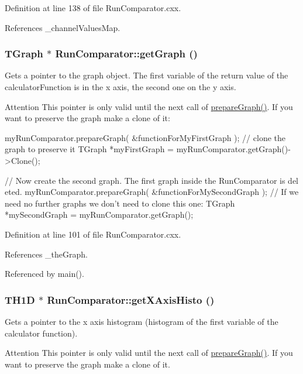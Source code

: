 Definition at line 138 of file RunComparator.cxx.

References \_\-channelValuesMap.\hypertarget{class_run_comparator_a75e708544897139bec4a7b11dc66925b}{
\subsubsection[{getGraph}]{\setlength{\rightskip}{0pt plus 5cm}TGraph $\ast$ RunComparator::getGraph ()}}
\label{class_run_comparator_a75e708544897139bec4a7b11dc66925b}


Gets a pointer to the graph object. The first variable of the return value of the calculatorFunction is in the x axis, the second one on the y axis. \begin{DoxyAttention}{Attention}
This pointer is only valid until the next call of \hyperlink{class_run_comparator_a31b28d33c185a2be5a17c42525dd2ec0}{prepareGraph()}. If you want to preserve the graph make a clone of it: 
\begin{DoxyCode}
  myRunComparator.prepareGraph( &functionForMyFirstGraph );
  // clone the graph to preserve it
  TGraph *myFirstGraph = myRunComparator.getGraph()->Clone();

  // Now create the second graph. The first graph inside the RunComparator is del
      eted.
  myRunComparator.prepareGraph( &functionForMySecondGraph );
  // If we need no further graphs we don't need to clone this one:
  TGraph *mySecondGraph = myRunComparator.getGraph();
\end{DoxyCode}
 
\end{DoxyAttention}


Definition at line 101 of file RunComparator.cxx.

References \_\-theGraph.

Referenced by main().\hypertarget{class_run_comparator_aa7db01e7789d70087584da1d3e6c281e}{
\subsubsection[{getXAxisHisto}]{\setlength{\rightskip}{0pt plus 5cm}TH1D $\ast$ RunComparator::getXAxisHisto ()}}
\label{class_run_comparator_aa7db01e7789d70087584da1d3e6c281e}


Gets a pointer to the x axis histogram (histogram of the first variable of the calculator function). \begin{DoxyAttention}{Attention}
This pointer is only valid until the next call of \hyperlink{class_run_comparator_a31b28d33c185a2be5a17c42525dd2ec0}{prepareGraph()}. If you want to preserve the graph make a clone of it. 
\end{DoxyAttention}


